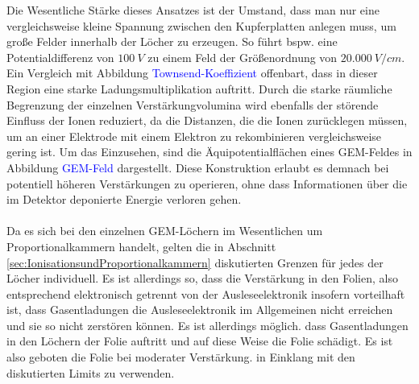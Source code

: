 \noindent Die Wesentliche Stärke dieses Ansatzes ist der Umstand, dass man nur eine vergleichsweise kleine Spannung zwischen den Kupferplatten anlegen muss, um große Felder innerhalb der Löcher zu erzeugen. So führt bspw. eine Potentialdifferenz von $100\ \si{V} $ zu einem Feld der Größenordnung von $20.000\ \si{V/cm}$. Ein Vergleich mit Abbildung \textcolor{blue}{Townsend-Koeffizient} offenbart, dass in dieser Region eine starke Ladungsmultiplikation auftritt. Durch die starke räumliche Begrenzung der einzelnen Verstärkungvolumina wird ebenfalls der störende Einfluss der Ionen reduziert, da die Distanzen, die die Ionen zurücklegen müssen, um an einer Elektrode mit einem Elektron zu rekombinieren vergleichsweise gering ist. Um das Einzusehen, sind die Äquipotentialflächen eines GEM-Feldes in Abbildung \textcolor{blue}{GEM-Feld} dargestellt. Diese Konstruktion erlaubt es demnach bei potentiell höheren Verstärkungen zu operieren, ohne dass Informationen über die im Detektor deponierte Energie verloren gehen. \\
\\
Da es sich bei den einzelnen GEM-Löchern im Wesentlichen um Proportionalkammern handelt, gelten die in Abschnitt \ref{sec:IonisationsundProportionalkammern} diskutierten Grenzen für jedes der Löcher individuell. Es ist allerdings so, dass die Verstärkung in den Folien, also entsprechend elektronisch getrennt von der Ausleseelektronik insofern vorteilhaft ist, dass Gasentladungen die Ausleseelektronik im Allgemeinen nicht erreichen und sie so nicht zerstören können. Es ist allerdings möglich. dass Gasentladungen in den Löchern der Folie auftritt und auf diese Weise die Folie schädigt. Es ist also geboten die Folie bei moderater Verstärkung. in Einklang mit den diskutierten Limits zu verwenden.
			



